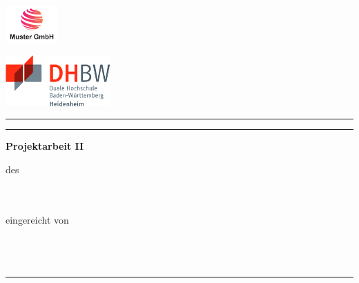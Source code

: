 \begin{titlepage}
    \noindent
    \begin{minipage}{0.45\textwidth}
        \includegraphics[width=2cm]{deckblatt/logos/company_logo.png}
    \end{minipage}
    \hfill
    \begin{minipage}{0.45\textwidth}
        \raggedleft
        \includegraphics[width=4cm]{deckblatt/logos/dhbw_logo.png}
    \end{minipage}

    \centering
    \vspace*{1.5cm}

    \begin{center}
    \rule{\textwidth}{0.6pt}
    \end{center}

    {\large\bfseries \projecttitle \par}

    \begin{center}
    \rule{\textwidth}{0.6pt}
    \end{center}

    {\large\bfseries Projektarbeit II\par}

    \vspace{0.5cm}
    {\normalsize des \degreeprogram\\
    \faculty\\
    \university\\
    \universitycity\par}
    
    \vspace{0.5cm}
    {\normalsize eingereicht von\\[0.1cm]
    \textbf{\studentname} \\
    \textbf{\studentaddress} \\
    \textbf{\studentcity} \\
    }

    \begin{center}
    \rule{\textwidth}{0.6pt}
    \end{center}


\end{titlepage}
